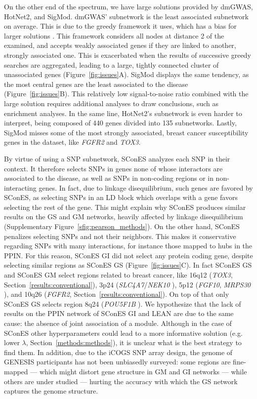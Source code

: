 \documentclass[twocolumn, 11pt]{article}
\begin{document}
On the other end of the spectrum, we have large solutions provided by dmGWAS, HotNet2, and SigMod. dmGWAS' subnetwork is the least associated subnetwork on average. This is due to the greedy framework it uses, which has a bias for larger solutions \cite{nikolayeva_network_2018}. This framework considers all nodes at distance 2 of the examined, and accepts weakly associated genes if they are linked to another, strongly associated one. This is exacerbated when the results of successive greedy searches are aggregated, leading to a large, tightly connected cluster of unassociated genes (Figure~\ref{fig:issues}A). SigMod displays the same tendency, as the most central genes are the least associated to the disease (Figure~\ref{fig:issues}B). This relatively low signal-to-noise ratio combined with the large solution requires additional analyses to draw conclusions, such as enrichment analyses. In the same line, HotNet2's subnetwork is even harder to interpret, being composed of 440 genes divided into 135 subnetworks. Lastly, SigMod misses some of the most strongly associated, breast cancer susceptibility genes in the dataset, like \emph{FGFR2} and \emph{TOX3}.

By virtue of using a SNP subnetwork, SConES analyzes each SNP in their context. It therefore selects SNPs in genes none of whose interactors are associated to the disease, as well as SNPs in non-coding regions or in non-interacting genes. In fact, due to linkage disequilibrium, such genes are favored by SConES, as selecting SNPs in an LD block which overlaps with a gene favors selecting the rest of the gene. This might explain why SConES produces similar results on the GS and GM networks, heavily affected by linkage disequilibrium (Supplementary Figure~\ref{sfig:pearson_methods}). On the other hand, SConES penalizes selecting SNPs and not their neighbors. This makes it conservative regarding SNPs with many interactions, for instance those mapped to hubs in the PPIN. For this reason, SConES GI did not select any protein coding gene, despite selecting similar regions as SConES GS (Figure~\ref{fig:issues}C). In fact SConES GS and SConES GM select regions related to breast cancer, like 16q12 (\emph{TOX3}, Section~\ref{results:conventional}), 3p24 (\emph{SLC4A7}/\emph{NEK10} \cite{ahmed_newly_2009}), 5p12 (\emph{FGF10}, \emph{MRPS30} \cite{quigley_5p12_2014}), and 10q26 (\emph{FGFR2}, Section~\ref{results:conventional}). On top of that only SConES GS selects region 8q24 (\emph{POU5F1B} \cite{breyer_expressed_2014}). We hypothesize that the lack of results on the PPIN network of SConES GI and LEAN are due to the same cause: the absence of joint association of a module. Although in the case of SConES other hyperparameters could lead to a more informative solution (e.g. lower \(\lambda\), Section~\ref{methods:methods}), it is unclear what is the best strategy to find them. In addition, due to the iCOGS SNP array design, the genome of GENESIS participants has not been unbiasedly surveyed: some regions are fine-mapped --- which might distort gene structure in GM and GI networks --- while others are under studied --- hurting the accuracy with which the GS network captures the genome structure.
\end{document}

